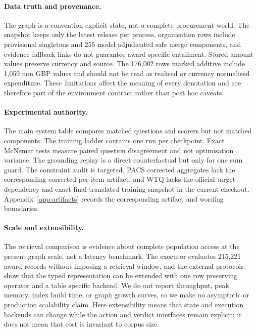\documentclass{article}
\begin{document}
\paragraph{Data truth and provenance.}
The graph is a convention explicit state, not a complete procurement world.  The snapshot keeps
only the latest release per process, organisation rows include provisional singletons and 255 model
adjudicated safe merge components, and evidence fallback links do not guarantee award specific
entailment.  Stored amount values preserve currency and source.  The 176,002 rows marked additive
include 1,059 non GBP values and should not be read as realised or currency normalised expenditure.
These limitations affect the meaning of every denotation and are therefore part of the environment
contract rather than post hoc caveats.

\paragraph{Experimental authority.}
The main system table compares matched questions and scorers but not matched components.  The
training ladder contains one run per checkpoint.  Exact McNemar tests measure paired question
disagreement and not optimisation variance.  The grounding replay is a direct counterfactual but
only for one sum guard.  The constraint audit is targeted.  PACS corrected aggregates lack the
corresponding corrected per item artifact, and WTQ lacks the official target dependency and exact
final translated training snapshot in the current checkout.  Appendix~\ref{app:artifacts} records
the corresponding artifact and wording boundaries.

\paragraph{Scale and extensibility.}
The retrieval comparison is evidence about complete population access at the present graph scale,
not a latency benchmark.  The executor evaluates 215,221 award records without imposing a retrieval
window, and the external protocols show that the typed representation can be extended with one
row preserving operator and a table specific backend.  We do not report throughput, peak memory,
index build time, or graph growth curves, so we make no asymptotic or production scalability claim.
Here extensibility means that state and execution backends can change while the action and verdict
interfaces remain explicit; it does not mean that cost is invariant to corpus size.
\end{document}
